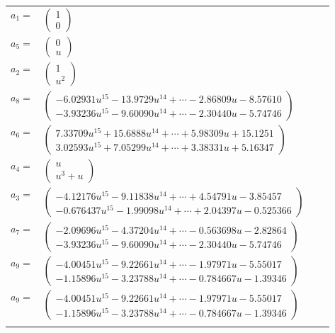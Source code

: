 \documentclass[1p]{elsarticle_modified}
\theoremstyle{definition}
\begin{document}
\begin{tabular}{m{7pt} m{180pt} m{7pt} m{180pt} }
\flushright $a_{1}=$&$\begin{pmatrix}1\\0\end{pmatrix}$ \\
\flushright $a_{5}=$&$\begin{pmatrix}0\\u\end{pmatrix}$ \\
\flushright $a_{2}=$&$\begin{pmatrix}1\\u^2\end{pmatrix}$ \\
\flushright $a_{8}=$&$\begin{pmatrix}-6.02931 u^{15}-13.9729 u^{14}+\cdots-2.86809 u-8.57610\\-3.93236 u^{15}-9.60090 u^{14}+\cdots-2.30440 u-5.74746\end{pmatrix}$ \\
\flushright $a_{6}=$&$\begin{pmatrix}7.33709 u^{15}+15.6888 u^{14}+\cdots+5.98309 u+15.1251\\3.02593 u^{15}+7.05299 u^{14}+\cdots+3.38331 u+5.16347\end{pmatrix}$ \\
\flushright $a_{4}=$&$\begin{pmatrix}u\\u^3+u\end{pmatrix}$ \\
\flushright $a_{3}=$&$\begin{pmatrix}-4.12176 u^{15}-9.11838 u^{14}+\cdots+4.54791 u-3.85457\\-0.676437 u^{15}-1.99098 u^{14}+\cdots+2.04397 u-0.525366\end{pmatrix}$ \\
\flushright $a_{7}=$&$\begin{pmatrix}-2.09696 u^{15}-4.37204 u^{14}+\cdots-0.563698 u-2.82864\\-3.93236 u^{15}-9.60090 u^{14}+\cdots-2.30440 u-5.74746\end{pmatrix}$ \\
\flushright $a_{9}=$&$\begin{pmatrix}-4.00451 u^{15}-9.22661 u^{14}+\cdots-1.97971 u-5.55017\\-1.15896 u^{15}-3.23788 u^{14}+\cdots-0.784667 u-1.39346\end{pmatrix}$\\ \flushright $a_{9}=$&$\begin{pmatrix}-4.00451 u^{15}-9.22661 u^{14}+\cdots-1.97971 u-5.55017\\-1.15896 u^{15}-3.23788 u^{14}+\cdots-0.784667 u-1.39346\end{pmatrix}$\\&\end{tabular}
\end{document}
